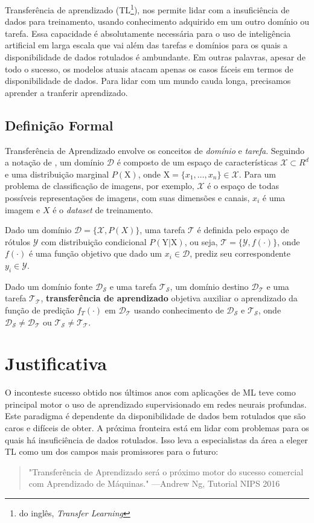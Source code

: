 \documentclass[
12pt, %
a4paper, %
onecolumn, %
]{article}
\begin{document}
Transferência de aprendizado (TL\footnote{do inglês, \textit{Transfer Learning}}), nos permite lidar com a insuficiência de dados para treinamento, usando conhecimento adquirido em um outro domínio ou tarefa. Essa capacidade é absolutamente necessária para o uso de inteligência artificial em larga escala que vai além das tarefas e domínios para os quais a disponibilidade de dados rotulados é ambundante. Em outras palavras, apesar de todo o sucesso, os modelos atuais atacam apenas os casos fáceis em termos de disponibilidade de dados. Para lidar com um mundo cauda longa, precisamos aprender a tranferir aprendizado.

\subsection{Definição Formal}
Transferência de Aprendizado envolve os conceitos de \textit{domínio} e \textit{tarefa}. Seguindo a notação de \cite{Pan}, um domínio $\mathcal{D}$ é composto de um espaço de características $\mathcal{X}\subset R^d$ e uma distribuição marginal $P(\mathrm{X})$, onde $\mathrm{X}=\{x_1, \dots, x_n\}\in\mathcal{X} $. Para um problema de classificação de imagens, por exemplo, $\mathcal{X}$ é o espaço de todas possíveis representações de imagens, com suas dimensões e canais, $x_i$ é uma imagem e $X$ é o \textit{dataset} de treinamento. 

Dado um domínio $\mathcal{D}=\{\mathcal{X}, P(X)\}$, uma tarefa $\mathcal{T}$ é definida pelo espaço de rótulos $\mathcal{Y}$ com distribuição condicional $P(\mathrm{Y}|\mathrm{X})$, ou seja, $\mathcal{T}=\{\mathcal{Y}, f(\cdot)\}$, onde $f(\cdot)$ é uma função objetivo que dado um $x_i \in \mathcal{D}$, prediz seu correspondente $y_i \in \mathcal{Y}$. 

Dado um domínio fonte $\mathcal{D_S}$ e uma tarefa $\mathcal{T_S}$, um domínio destino $\mathcal{D_T}$ e uma tarefa $\mathcal{T_T}$, \textbf{transferência de aprendizado} objetiva auxiliar o aprendizado da função de predição $f_T(\cdot)$ em  $\mathcal{D_T}$ usando conhecimento de $\mathcal{D_S}$ e $\mathcal{T_S}$, onde $\mathcal{D_S}\neq\mathcal{D_T}$ ou $\mathcal{T_S}\neq\mathcal{T_T}$.



\section{Justificativa}
O inconteste sucesso obtido nos últimos anos com aplicações de ML teve como principal motor o uso de aprendizado supervisionado em redes neurais profundas. Este paradigma é dependente da disponibilidade de dados bem rotulados que são caros e difíceis de obter. A próxima fronteira está em lidar com problemas para os quais há insuficiência de dados rotulados. Isso leva a especialistas da área a eleger TL como um dos campos mais promissores para o futuro:
\begin{quote} "Transferência de Aprendizado será o próximo motor do sucesso comercial com Aprendizado de Máquinas." \hfill ---Andrew Ng, Tutorial NIPS 2016 \cite{ANg}
\end{quote}
\end{document}
